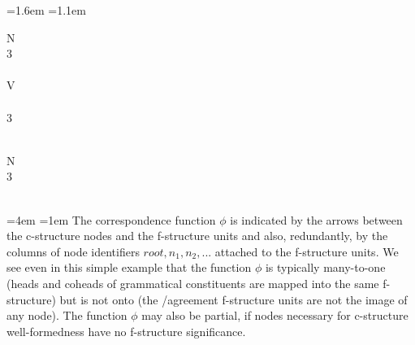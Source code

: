 \documentclass[output=paper,hidelinks]{langscibook}
\begin{document}
=1.6em
=1.1em
\ea\label{Lexsee}
\parbox[t]{18.4em}{
N{\\3\\}\vspace{.4em}\\
V{\\\\3\\}
}
\parbox[t]{0em}{
\vspace{.4em}\\
N{\\3\\\\
}}
\z
{}=4em
=1em
The correspondence function $\phi$ is indicated by the arrows between the c-struc\-ture nodes and the f-structure units and also, redundantly, by the columns of node identifiers $root, n_1, n_2,...$ attached to the f-structure units.  We see even in this simple example that the function $\phi$ is typically many-to-one (heads and coheads of grammatical constituents are mapped into the same f-structure) but is not onto (the /agreement f-structure units are not the image of any node).   The function $\phi$ may also be partial, if nodes necessary for c-structure well-formedness have no f-structure significance.
\end{document}
